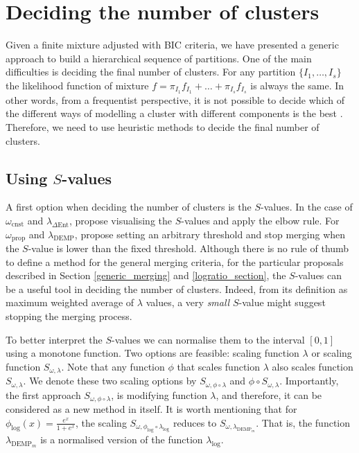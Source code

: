 \documentclass[submit]{smj}
\theoremstyle{definition}
\begin{document}
\section{Deciding the number of clusters}\label{number_clusters}

Given a finite mixture adjusted with BIC criteria, we have presented a generic approach to build a hierarchical sequence of partitions. One of the main difficulties is deciding the final number of clusters. For any partition $\{I_1, \dots, I_{s}\}$ the likelihood function of mixture $f = \pi_{I_1} f_{I_1} + \dots + \pi_{I_s} f_{I_s}$ is always the same. In other words, from a frequentist perspective, it is not possible to decide which of the different ways of modelling a cluster with different components is the best  \citep{hennig2010methods}. Therefore, we need to use heuristic methods to decide the final number of clusters.

\subsection{Using $S$-values}

A first option when deciding the number of clusters is the $S$-values. In the case of $\omega_{\text{cnst}}$ and $\lambda_{\Delta\text{Ent}}$, \cite{baudry2010combining} propose  visualising the $S$-values and apply the elbow rule. For $\omega_{\text{prop}}$ and $\lambda_{\text{DEMP}}$, \cite{hennig2010methods} propose setting an arbitrary threshold and stop merging when the $S$-value is lower than the fixed threshold. Although there is no rule of thumb to define a method for the general merging criteria, for the particular proposals described in Section \ref{generic_merging} and \ref{logratio_section}, the $S$-values can be a useful tool in deciding the number of clusters. Indeed, from its definition as maximum weighted average of $\lambda$ values, a very \emph{small} $S$-value might suggest stopping the merging process.

To better interpret the $S$-values we can normalise them to the interval $\left[0,1\right]$ using a monotone function. Two options are feasible: scaling function $\lambda$ or scaling function $S_{\omega, \lambda}$. Note that any function $\phi$ that scales function $\lambda$ also scales function $S_{\omega, \lambda}$. We denote these two scaling options by $S_{\omega, \phi \circ \lambda}$ and $\phi \circ S_{\omega, \lambda}$. Importantly, the first approach $S_{\omega, \phi \circ \lambda}$, is modifying function $\lambda$, and therefore, it can be considered as a new method in itself. It is worth mentioning that for $\phi_{\log}(x)=\frac{e^x}{1+e^x}$, the scaling $S_{\omega, \phi_{\log} \circ \lambda_{\log}}$ reduces to $S_{\omega, \lambda_{\text{DEMP}_m}}$. That is, the  function $\lambda_{\text{DEMP}_m}$ \citep{longford2014} is a normalised version of the function $\lambda_{\log}$.
\end{document}
